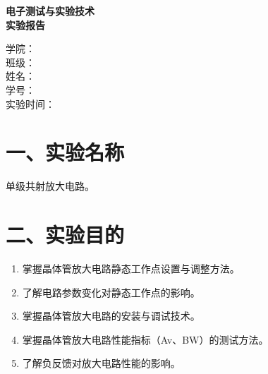 \documentclass[a4paper,12pt]{article}
\begin{document}
\begin{titlepage}
    \centering
    \vfill
    {\bfseries 电子测试与实验技术\\[0.6em]实验报告\par}
    \vfill
    \vfill

    \begin{minipage}{0.72\textwidth}
        学\quad\quad 院：\underline{}\\[1.6em]
        班\quad\quad 级：\underline{}\\[1.6em]
        姓\quad\quad 名：\underline{}\\[1.6em]
        学\quad\quad 号：\underline{}\\[1.6em]
        实验时间：\underline{}
    \end{minipage}

    \vfill
    \vfill
\end{titlepage}

\setcounter{page}{1}



\section*{一、实验名称}
单级共射放大电路。

\section*{二、实验目的}
\begin{enumerate}
    \item 掌握晶体管放大电路静态工作点设置与调整方法。
    \item 了解电路参数变化对静态工作点的影响。
    \item 掌握晶体管放大电路的安装与调试技术。
    \item 掌握晶体管放大电路性能指标（Av、BW）的测试方法。
    \item 了解负反馈对放大电路性能的影响。
    
\end{enumerate}
\end{document}
